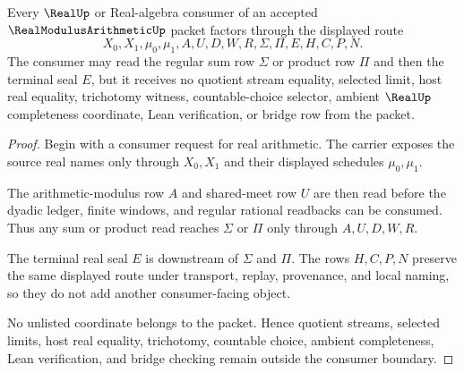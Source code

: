 \begin{theorem}
\label{thm:real-modulus-arithmetic-consumer-boundary}
Every $\RealUp$ or Real-algebra consumer of an accepted $\RealModulusArithmeticUp$ packet factors through the displayed route
$$
X_0,X_1,\mu_0,\mu_1,A,U,D,W,R,\Sigma,\Pi,E,H,C,P,N.
$$
The consumer may read the regular sum row $\Sigma$ or product row $\Pi$ and then the terminal seal $E$, but it receives no quotient stream equality, selected limit, host real equality, trichotomy witness, countable-choice selector, ambient $\RealUp$ completeness coordinate, Lean verification, or bridge row from the packet.
\end{theorem}
\begin{proof}
Begin with a consumer request for real arithmetic. The carrier exposes the source real names only through $X_0,X_1$ and their displayed schedules $\mu_0,\mu_1$.

The arithmetic-modulus row $A$ and shared-meet row $U$ are then read before the dyadic ledger, finite windows, and regular rational readbacks can be consumed. Thus any sum or product read reaches $\Sigma$ or $\Pi$ only through $A,U,D,W,R$.

The terminal real seal $E$ is downstream of $\Sigma$ and $\Pi$. The rows $H,C,P,N$ preserve the same displayed route under transport, replay, provenance, and local naming, so they do not add another consumer-facing object.

No unlisted coordinate belongs to the packet. Hence quotient streams, selected limits, host real equality, trichotomy, countable choice, ambient completeness, Lean verification, and bridge checking remain outside the consumer boundary.
\end{proof}



